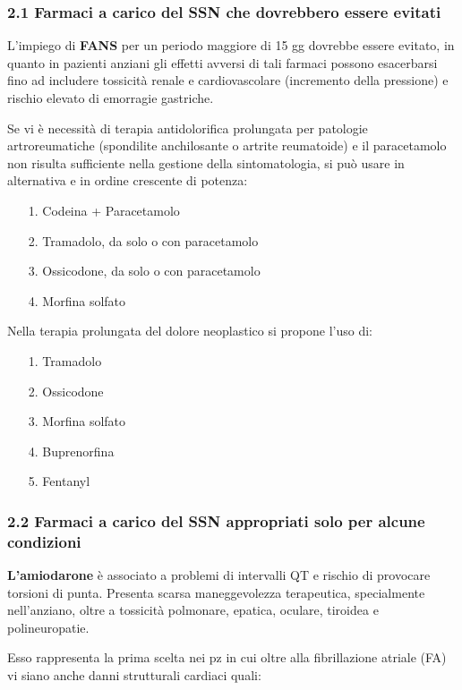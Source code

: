   \subsubsection{2.1 Farmaci a carico del SSN che dovrebbero essere evitati}

  L'impiego di \textbf{FANS} per un periodo maggiore di 15 gg dovrebbe
  essere evitato, in quanto in pazienti anziani gli effetti avversi di
  tali farmaci possono esacerbarsi fino ad includere tossicità renale e
  cardiovascolare (incremento della pressione) e rischio elevato di
  emorragie gastriche.

  Se vi è necessità di terapia antidolorifica prolungata per patologie
  artroreumatiche (spondilite anchilosante o artrite reumatoide) e il
  paracetamolo non risulta sufficiente nella gestione della
  sintomatologia, si può usare in alternativa e in ordine crescente di
  potenza:

\begin{itemize}
\item[1.]
  Codeina + Paracetamolo
\item[2.]
  Tramadolo, da solo o con paracetamolo
\item[3.]
  Ossicodone, da solo o con paracetamolo
\item[4.]
  Morfina solfato
\end{itemize}

  Nella terapia prolungata del dolore neoplastico si propone l'uso di:

\begin{itemize}
\item[1.]
  Tramadolo
\item[2.]
  Ossicodone
\item[3.]
  Morfina solfato
\item[4.]
  Buprenorfina
\item[5.]
  Fentanyl
\end{itemize}

  \subsubsection{2.2 Farmaci a carico del SSN appropriati solo per alcune condizioni}

  \textbf{L'amiodarone} è associato a problemi di intervalli QT e
  rischio di provocare torsioni di punta. Presenta scarsa maneggevolezza
  terapeutica, specialmente nell'anziano, oltre a tossicità polmonare,
  epatica, oculare, tiroidea e polineuropatie.

  Esso rappresenta la prima scelta nei pz in cui oltre alla
  fibrillazione atriale (FA) vi siano anche danni strutturali cardiaci
  quali:

